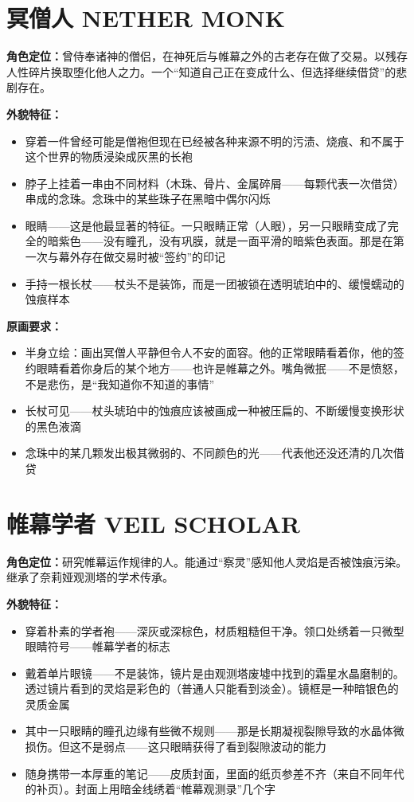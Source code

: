 \documentclass[12pt,a4paper,openany]{ctexbook}
\begin{document}
\section{冥僧人 NETHER MONK}

\textbf{角色定位：}曾侍奉诸神的僧侣，在神死后与帷幕之外的古老存在做了交易。以残存人性碎片换取堕化他人之力。一个“知道自己正在变成什么、但选择继续借贷”的悲剧存在。

\textbf{外貌特征：}
\begin{itemize}
    \item 穿着一件曾经可能是僧袍但现在已经被各种来源不明的污渍、烧痕、和不属于这个世界的物质浸染成灰黑的长袍
    \item 脖子上挂着一串由不同材料（木珠、骨片、金属碎屑——每颗代表一次借贷）串成的念珠。念珠中的某些珠子在黑暗中偶尔闪烁
    \item 眼睛——这是他最显著的特征。一只眼睛正常（人眼），另一只眼睛变成了完全的暗紫色——没有瞳孔，没有巩膜，就是一面平滑的暗紫色表面。那是在第一次与幕外存在做交易时被“签约”的印记
    \item 手持一根长杖——杖头不是装饰，而是一团被锁在透明琥珀中的、缓慢蠕动的蚀痕样本
\end{itemize}

\textbf{原画要求：}
\begin{itemize}
    \item 半身立绘：画出冥僧人平静但令人不安的面容。他的正常眼睛看着你，他的签约眼睛看着你身后的某个地方——也许是帷幕之外。嘴角微抿——不是愤怒，不是悲伤，是“我知道你不知道的事情”
    \item 长杖可见——杖头琥珀中的蚀痕应该被画成一种被压扁的、不断缓慢变换形状的黑色液滴
    \item 念珠中的某几颗发出极其微弱的、不同颜色的光——代表他还没还清的几次借贷
\end{itemize}

\section{帷幕学者 VEIL SCHOLAR}

\textbf{角色定位：}研究帷幕运作规律的人。能通过“察灵”感知他人灵焰是否被蚀痕污染。继承了奈莉娅观测塔的学术传承。

\textbf{外貌特征：}
\begin{itemize}
    \item 穿着朴素的学者袍——深灰或深棕色，材质粗糙但干净。领口处绣着一只微型眼睛符号——帷幕学者的标志
    \item 戴着单片眼镜——不是装饰，镜片是由观测塔废墟中找到的霜星水晶磨制的。透过镜片看到的灵焰是彩色的（普通人只能看到淡金）。镜框是一种暗银色的灵质金属
    \item 其中一只眼睛的瞳孔边缘有些微不规则——那是长期凝视裂隙导致的水晶体微损伤。但这不是弱点——这只眼睛获得了看到裂隙波动的能力
    \item 随身携带一本厚重的笔记——皮质封面，里面的纸页参差不齐（来自不同年代的补页）。封面上用暗金线绣着“帷幕观测录”几个字
\end{itemize}
\end{document}
